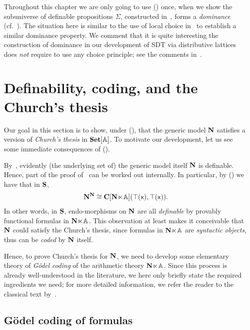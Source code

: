 \begin{remark}
  Throughout this chapter we are only going to use (\AxiomLC) once, when we show the subuniverse of definable propositions $\Sigma$, constructed in~, forms a \emph{dominance} (cf.~). The situation here is similar to the use of local choice in~\citet{Cherubini_Coquand_Hutzler_2024} to establish a similar dominance property. We comment that it is quite interesting the construction of dominance in our development of \gls{SDT} via distributive lattices does \emph{not} require to use any choice principle; see the comments in~.
\end{remark}



\section{Definability, coding, and the Church's thesis}

Our goal in this section is to show, under (\AxiomSQCA), that the generic model $\mathbf N$ satisfies a version of \emph{Church's thesis} in $\mathbf{Set}[\mathbb{A}]$. To motivate our development, let us see some immediate consequences of (\AxiomSQCA).

By~, evidently (the underlying set of) the generic model itself $\mathbf N$ is definable. Hence, part of the proof of~ can be worked out internally. In particular, by (\AxiomSQCA) we have that in $\mathbf{S}$,
\[ \mathbf N^\mathbf N \cong \mathbf{C}[\mathbf N\hspace{-.4ex}\ltimes\hspace{-.4ex}\mathbb{A}](\top(\mathsf{x}),\top(\mathsf{x})). \]
In other words, in $\mathbf{S}$, endo-morphisms on $\mathbf N$ are all \emph{definable} by provably functional formulas in $\mathbf N\hspace{-.4ex}\ltimes\hspace{-.4ex}\mathbb{A}$. This observation at least makes it conceivable that $\mathbf N$ could satisfy the Church's thesis, since formulas in $\mathbf N\hspace{-.4ex}\ltimes\hspace{-.4ex}\mathbb{A}$ are \emph{syntactic objects}, thus can be \emph{coded} by $\mathbf N$ itself.

Hence, to prove Church's thesis for $\mathbf N$, we need to develop some elementary theory of \emph{G\"odel coding} of the arithmetic theory $\mathbf N\hspace{-.4ex}\ltimes\hspace{-.4ex}\mathbb{A}$. Since this process is already well-understood in the literature, we here only briefly state the required ingredients we need; for more detailed information, we refer the reader to the classical text by~\citet{Hájek_Pudlák_2017}.

\subsection{G\"odel coding of formulas}\label{subsec:godelcoding}

